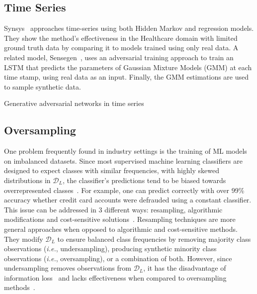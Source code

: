 \documentclass[parskip=full]{scrartcl}
\begin{document}
\subsection{Time Series}


Synsys~\cite{dahmen2019synsys} approaches time-series using both Hidden Markov
and regression models. They show the method's effectiveness in the Healthcare
domain with limited ground truth data by comparing it to models trained using
only real data. A related model, Sensegen~\cite{alzantot2017sensegen}, uses an
adversarial training approach to train an LSTM that predicts the parameters
of Gaussian Mixture Models (GMM) at each time stamp, using real data as
an input. Finally, the GMM estimations are used to sample synthetic data. 


Generative adversarial networks in time series 


\subsection{Oversampling}\label{sec:oversampling}

One problem frequently found in industry settings is the training of ML models
on imbalanced datasets. Since most supervised machine learning classifiers are
designed to expect classes with similar frequencies, with highly skewed
distributions in $\mathcal{D}_L$, the classifier’s predictions tend to be
biased towards overrepresented classes~\cite{fonseca2021improving}. For
example, one can predict correctly with over 99\% accuracy whether credit card
accounts were defrauded using a constant classifier. This issue can be
addressed in 3 different ways: resampling, algorithmic modifications and
cost-sensitive solutions~\cite{douzas2019imbalanced}. Resampling techniques
are more general approaches when opposed to algorithmic and cost-sensitive
methods.  They modify $\mathcal{D}_L$ to ensure balanced class frequencies by
removing majority class observations (\textit{i.e.}, undersampling), producing
synthetic minority class observations (\textit{i.e.}, oversampling), or a
combination of both. However, since undersampling removes observations from
$\mathcal{D}_L$, it has the disadvantage of information
loss~\cite{feng2019imbalanced} and lacks effectiveness when compared to
oversampling methods~\cite{mohammed2020machine, hernandez2013empirical}.
\end{document}
